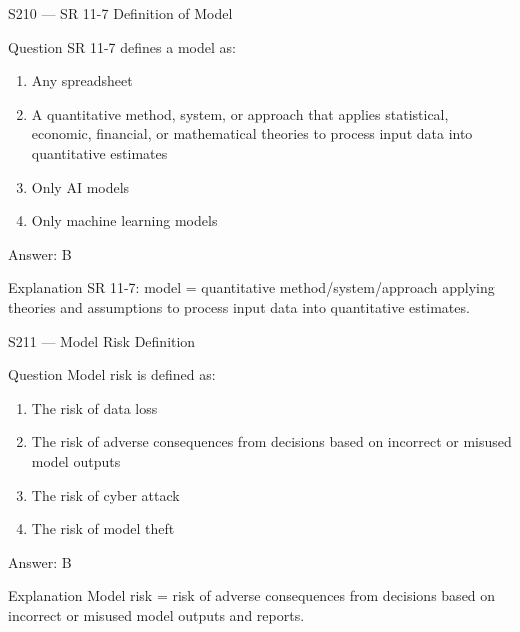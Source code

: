 \documentclass[aspectratio=169,8pt]{beamer}
\begin{document}
	\begin{frame}{S210 --- SR 11-7 Definition of Model}
		\begin{block}{Question}
			SR 11-7 defines a model as:
			\begin{enumerate}
				\item Any spreadsheet
				\item A quantitative method, system, or approach that applies statistical, economic, financial, or mathematical theories to process input data into quantitative estimates
				\item Only AI models
				\item Only machine learning models
			\end{enumerate}
		\end{block}
		\begin{exampleblock}{Answer: B}\end{exampleblock}
		\begin{block}{Explanation}
			SR 11-7: model = quantitative method/system/approach applying theories and assumptions to process input data into quantitative estimates.
		\end{block}
	\end{frame}
	
	\begin{frame}{S211 --- Model Risk Definition}
		\begin{block}{Question}
			Model risk is defined as:
			\begin{enumerate}
				\item The risk of data loss
				\item The risk of adverse consequences from decisions based on incorrect or misused model outputs
				\item The risk of cyber attack
				\item The risk of model theft
			\end{enumerate}
		\end{block}
		\begin{exampleblock}{Answer: B}\end{exampleblock}
		\begin{block}{Explanation}
			Model risk = risk of adverse consequences from decisions based on incorrect or misused model outputs and reports.
		\end{block}
	\end{frame}
	
\end{document}
